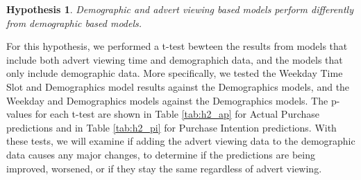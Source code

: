 \documentclass[review]{elsarticle}
\newtheorem{hyp}{Hypothesis}
\begin{document}
\begin{hyp}
\label{hyp:2}
Demographic and advert viewing based models perform differently from demographic based models.
\end{hyp}

For this hypothesis, we performed a t-test bewteen the results from models that include both advert viewing time and demographich data, and the models that only include demographic data. More specifically, we tested the Weekday Time Slot and Demographics model results against the Demographics models, and the Weekday and Demographics models against the Demographics models. The p-values for each t-test are shown in Table \ref{tab:h2_ap} for Actual Purchase predictions and in Table \ref{tab:h2_pi} for Purchase Intention predictions. With these tests, we will examine if adding the advert viewing data to the demographic data causes any major changes, to determine if the predictions are being improved, worsened, or if they stay the same regardless of advert viewing.
\end{document}
